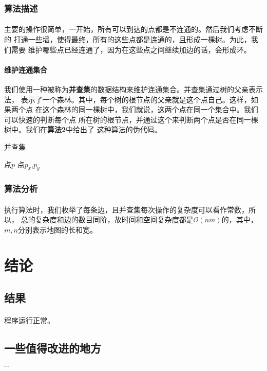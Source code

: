 \documentclass{article}
\begin{document}
		\subsubsection{算法描述}
			\paragraph{}
				主要的操作很简单，一开始，所有可以到达的点都是不连通的。然后我们考虑不断的
				打通一些墙，使得最终，所有的这些点都是连通的，且形成一棵树。为此，我们需要
				维护哪些点已经连通了，因为在这些点之间继续加边的话，会形成环。
			\paragraph{维护连通集合}
				我们使用一种被称为\textbf{并查集}的数据结构来维护连通集合。并查集通过树的父亲表示法，
				表示了一个森林。其中，每个树的根节点的父亲就是这个点自己。这样，如果两个点
				在这个森林的同一棵树中，我们就说，这两个点在同一个集合中。我们可以快速的判断每个点
				所在树的根节点，并通过这个来判断两个点是否在同一棵树中。我们在\textbf{算法2}中给出了
				这种算法的伪代码。
				\begin{algorithm}
					\caption{并查集}
					\begin{algorithmic}[1]
						 {}
							\EndFor
						\EndFunction
						 {点$p$}
							\Else 
							\EndIf
						\EndFunction
						 {点$p_x$,$p_y$}
							\EndIf
						\EndFunction
					\end{algorithmic}
				\end{algorithm}
		\subsubsection{算法分析}
			\paragraph{}
				执行算法时，我们枚举了每条边，且并查集每次操作的复杂度可以看作常数，所以，
				总的复杂度和边的数目同阶，故时间和空间复杂度都是$\mathcal{O}(nm)$的，其中，
				$m,n$分别表示地图的长和宽。
\section{结论}
	\subsection{结果}
		\paragraph{} 
			程序运行正常。
	\subsection{一些值得改进的地方}
		\paragraph{$\cdots$}
\end{document}
